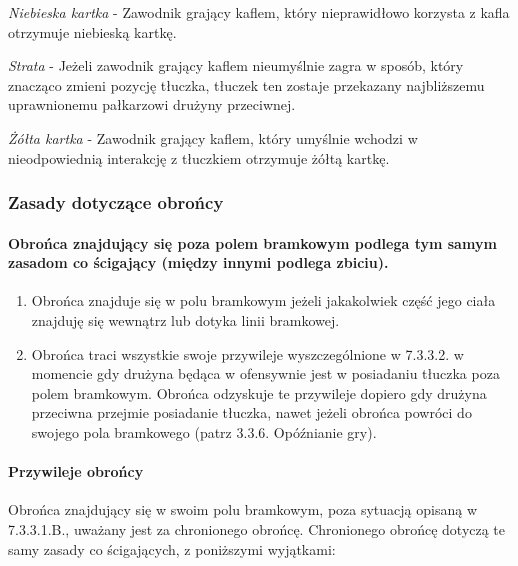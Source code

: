 \documentclass[12pt]{article}
\begin{document}
\emph{Niebieska kartka} - Zawodnik grający kaflem, który nieprawidłowo
korzysta z kafla otrzymuje niebieską kartkę.

\emph{Strata} - Jeżeli zawodnik grający kaflem nieumyślnie zagra w
sposób, który znacząco zmieni pozycję tłuczka, tłuczek ten zostaje
przekazany najbliższemu uprawnionemu pałkarzowi drużyny przeciwnej.

\emph{Żółta kartka} - Zawodnik grający kaflem, który umyślnie wchodzi w
nieodpowiednią interakcję z tłuczkiem otrzymuje żółtą kartkę.

\subsubsection{Zasady dotyczące obrońcy}

\paragraph{Obrońca znajdujący się poza polem bramkowym podlega
	tym samym zasadom co ścigający (między innymi podlega zbiciu).}

\begin{enumerate}
	\item
	      Obrońca znajduje się w polu bramkowym jeżeli jakakolwiek część jego
	      ciała znajduję się wewnątrz lub dotyka linii bramkowej.
	\item
	      Obrońca traci wszystkie swoje przywileje wyszczególnione w 7.3.3.2. w
	      momencie gdy drużyna będąca w ofensywnie jest w posiadaniu tłuczka
	      poza polem bramkowym. Obrońca odzyskuje te przywileje dopiero gdy
	      drużyna przeciwna przejmie posiadanie tłuczka, nawet jeżeli obrońca
	      powróci do swojego pola bramkowego (patrz 3.3.6. Opóźnianie gry).
\end{enumerate}

\paragraph{Przywileje obrońcy}
Obrońca znajdujący się w swoim
polu bramkowym, poza sytuacją opisaną w 7.3.3.1.B., uważany jest za
chronionego obrońcę. Chronionego obrońcę dotyczą te samy zasady co
ścigających, z poniższymi wyjątkami:
\end{document}
